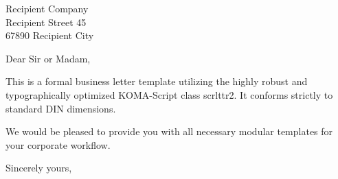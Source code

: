 \documentclass[fontsize=11pt,paper=a4]{scrlttr2}
\begin{document}
\begin{letter}{Recipient Company\\Recipient Street 45\\67890 Recipient City}
\opening{Dear Sir or Madam,}

This is a formal business letter template utilizing the highly robust and typographically optimized KOMA-Script class scrlttr2. It conforms strictly to standard DIN dimensions.

We would be pleased to provide you with all necessary modular templates for your corporate workflow.

\closing{Sincerely yours,}
\end{letter}
\end{document}
